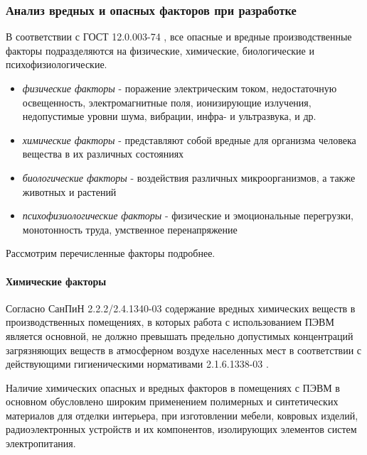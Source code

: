 \newpage
\subsubsection{Анализ вредных и опасных факторов при разработке}

В соответствии с ГОСТ 12.0.003-74 \cite{ecology_gost_003_74}, все опасные и
вредные производственные факторы подразделяются на физические, химические,
биологические и психофизиологические.

\begin{itemize}
    \item   \textit{физические факторы} - поражение электрическим током, недостаточную
            освещенность, электромагнитные поля, ионизирующие излучения, недопустимые
            уровни шума, вибрации, инфра- и ультразвука, и др.
    \item   \textit{химические факторы} - представляют собой вредные для организма
            человека вещества в их различных состояниях
    \item   \textit{биологические факторы} - воздействия различных микроорганизмов,
            а также животных и растений
    \item   \textit{психофизиологические факторы} - физические и эмоциональные
            перегрузки, монотонность труда, умственное перенапряжение

\end{itemize}

Рассмотрим перечисленные факторы подробнее.

\paragraph{Химические факторы}

Согласно СанПиН 2.2.2/2.4.1340-03 \cite{ecology_sanpin_1340_03} содержание вредных
химических веществ в
производственных помещениях, в которых работа с использованием ПЭВМ является
основной, не должно превышать предельно допустимых концентраций загрязняющих
веществ в атмосферном воздухе населенных мест в соответствии с действующими
гигиеническими нормативами 2.1.6.1338-03 \cite{ecology_hygiene_norm_1338_03}.

Наличие химических опасных и вредных факторов в помещениях с ПЭВМ в основном
обусловлено широким применением полимерных и синтетических материалов для отделки
интерьера, при изготовлении мебели, ковровых изделий, радиоэлектронных устройств
и их компонентов, изолирующих элементов систем электропитания.


